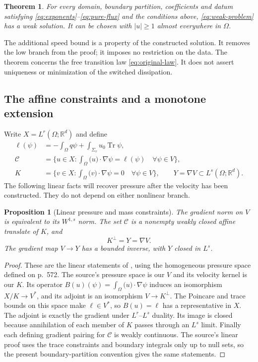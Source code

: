 \documentclass[11pt]{article}
\newtheorem{theorem}{Theorem}
\newtheorem{proposition}[proposition]{Proposition}
\theoremstyle{remark}
\newcommand{\R}{\mathbb R}
\newcommand{\Tr}{\operatorname{Tr}}
\newcommand{\pair}[2]{\int_\Omega \big(#1\big)\cdot #2}
\begin{document}
\begin{theorem}\label{thm:existence}
For every domain, boundary partition, coefficients and datum satisfying
\eqref{eq:exponents}--\eqref{eq:pure-flux} and the conditions above,
\eqref{eq:weak-problem} has a weak solution. It can be chosen with
$|u|\ge1$ almost everywhere in $\Omega$.
\end{theorem}

The additional speed bound is a property of the constructed solution. It
removes the low branch from the proof; it imposes no restriction on the data.
The theorem concerns the free transition law \eqref{eq:original-law}. It
does not assert uniqueness or minimization of the switched dissipation.

\subsection{The affine constraints and a monotone extension}
Write $X=L^r(\Omega;\R^d)$ and define
\begin{align*}
 \ell(\psi)&=-\int_\Omega q\psi+\int_{\Sigma_v}u_0\Tr\psi,\\
 \mathcal C&=\{u\in X:\pair{u}{\nabla\psi}=\ell(\psi)\quad\forall\psi\in V\},\\
 K&=\{v\in X:\pair{v}{\nabla\psi}=0\quad\forall\psi\in V\},
 \qquad Y=\nabla V\subset L^s(\Omega;\R^d).
\end{align*}
The following linear facts will recover pressure after the velocity has
been constructed. They do not depend on either nonlinear branch.

\begin{proposition}[Linear pressure and mass constraints]\label{prop:linear}
The gradient norm on $V$ is equivalent to its $W^{1,s}$ norm.
The set $\mathcal C$ is a nonempty weakly closed affine translate of $K$,
and
\[
 K^\perp=Y=\nabla V.
\]
The gradient map $V\to Y$ has a bounded inverse, with $Y$ closed in $L^s$.
\end{proposition}
\begin{proof}
These are the linear statements of \cite[Lemmas 4.1--4.2, pp.\ 573--574]{FP22},
using the homogeneous pressure space defined on p.\ 572. The source's
pressure space is our $V$ and its velocity kernel is our $K$. Its operator
$B(u)(\psi)=\pair{u}{\nabla\psi}$ induces an isomorphism
$X/K\to V^*$, and its adjoint is an isomorphism $V\to K^\perp$.
The Poincare and trace bounds on this space make $\ell\in V^*$,
so $B(u)=\ell$ has a representative in $X$.
The adjoint is exactly the gradient under $L^r$--$L^s$ duality.
Its image is closed because annihilation of each member of $K$ passes
through an $L^s$ limit. Finally each defining gradient pairing for
$\mathcal C$ is weakly continuous. The source's linear proof uses the
trace constraints and boundary integrals only up to null sets, so the
present boundary-partition convention gives the same statements.
\end{proof}
\end{document}
